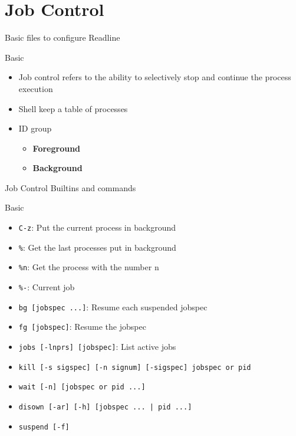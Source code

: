 \documentclass[10pt, compress, aspectratio=169]{beamer}
\begin{document}
\section{Job Control}

\begin{frame}{Basic files to configure Readline}
  \begin{exampleblock}{Basic}
    \begin{itemize}
      \item Job control refers to the ability to selectively stop and continue
            the process execution
      \item Shell keep a table of processes
      \item ID group
      \begin{itemize}
        \item \textbf{Foreground}
        \item \textbf{Background}
      \end{itemize}
    \end{itemize}
  \end{exampleblock}
\end{frame}

\begin{frame}{Job Control Builtins and commands}
  \begin{exampleblock}{Basic}
    \begin{itemize}
      \item \texttt{C-z}: Put the current process in background
      \item \texttt{\%}: Get the last processes put in background
      \item \texttt{\%n}: Get the process with the number n
      \item \texttt{\%-}: Current job
      \item \texttt{bg [jobspec ...]}: Resume each suspended jobspec
      \item \texttt{fg [jobspec]}: Resume the jobspec
      \item \texttt{jobs [-lnprs] [jobspec]}: List active jobs
      \item \texttt{kill [-s sigspec] [-n signum] [-sigspec] jobspec or pid}
      \item \texttt{wait [-n] [jobspec or pid ...]}
      \item \texttt{disown [-ar] [-h] [jobspec ... | pid ...]}
      \item \texttt{suspend [-f]}
    \end{itemize}
  \end{exampleblock}
\end{frame}
\end{document}
